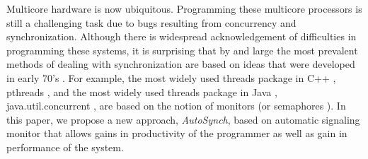 \documentclass{sigplanconf}
\begin{document}




Multicore hardware is now ubiquitous. Programming these multicore processors is
still a challenging task due to
bugs resulting from concurrency and synchronization.
Although there is widespread acknowledgement of difficulties 
in programming these systems, it is surprising that by and large the most 
prevalent methods of dealing with synchronization are based on ideas that were 
developed in early 70's \cite{dijk68, hoa74, bh75a}. For 
example, the most widely used threads package in C++ \cite{stro97}, 
pthreads \cite{bute97}, and the most widely used threads package in Java \cite{gjs00}, 
java.util.concurrent \cite{lea05}, are based
on the notion of monitors \cite{hoa74, bh75a}(or semaphores 
\cite{dijk65, dijk68}). 
In this paper, we propose a new approach, {\em AutoSynch}, based on
automatic signaling monitor 
that allows gains in productivity of the programmer as well as gain in
performance of the system.
\end{document}
